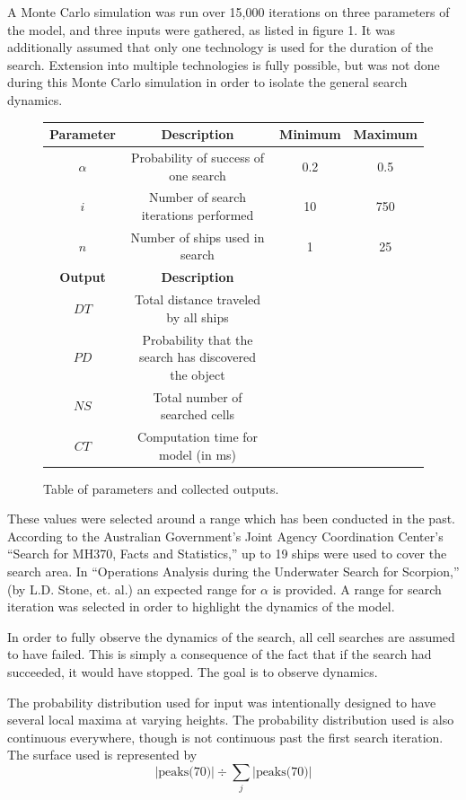 \documentclass[a4paper]{article}
\begin{document}
A Monte Carlo simulation was run over 15,000 iterations on three parameters of the model, and three inputs were gathered, as listed in figure 1. It was additionally assumed that only one technology is used for the duration of the search. Extension into multiple technologies is fully possible, but was not done during this Monte Carlo simulation in order to isolate the general search dynamics.

\begin{figure}[H]\begin{center}\begin{tabular}{|c|c|c|c|}
\hline \textbf{Parameter} & \textbf{Description} & \textbf{Minimum} & \textbf{Maximum}\\\hline\hline
$\alpha$ & Probability of success of one search & 0.2 & 0.5 \\\hline
$i$ & Number of search iterations performed & 10 & 750 \\\hline
$n$ & Number of ships used in search & 1 & 25 \\\hline\hline
\textbf{Output} & \textbf{Description} &&\\\hline
$DT$ & Total distance traveled by all ships &&\\\hline
$PD$ & Probability that the search has discovered the object &&\\\hline
$NS$ & Total number of searched cells &&\\\hline
$CT$ & Computation time for model (in ms) &&\\\hline
\end{tabular}\end{center}
\caption{Table of parameters and collected outputs.}
\end{figure}

These values were selected around a range which has been conducted in the past.  According to the Australian Government's Joint Agency Coordination Center's ``Search for MH370, Facts and Statistics,'' up to 19 ships were used to cover the search area. In ``Operations Analysis during the Underwater Search for Scorpion,'' (by L.D. Stone, et. al.) an expected range for $\alpha$ is provided.  A range for search iteration was selected in order to highlight the dynamics of the model.

In order to fully observe the dynamics of the search, all cell searches are assumed to have failed. This is simply a consequence of the fact that if the search had succeeded, it would have stopped. The goal is to observe dynamics.

The probability distribution used for input was intentionally designed to have several local maxima at varying heights. The probability distribution used is also continuous everywhere, though is not continuous past the first search iteration. The surface used is represented by $$|\mbox{peaks(70)}|\div \sum_j |\text{peaks(70)}|$$
\end{document}
